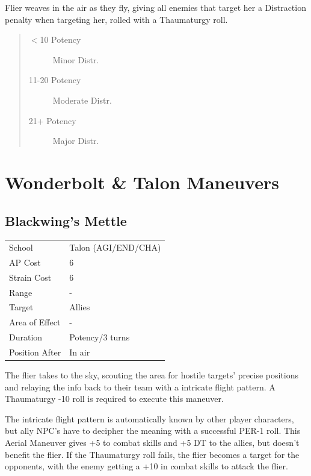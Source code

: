 \documentclass[11pt,a4paper,twocolumn]{book}
\begin{document}
\medskip

Flier weaves in the air as they fly, giving all enemies that target her a Distraction penalty when targeting her, rolled with a Thaumaturgy roll.

\begin{quote}
  \begin{description}
    \item[$<$10 Potency] 	Minor Distr.
    \item[11-20 Potency] 	Moderate Distr.
    \item[21+ Potency] 	Major Distr.
  \end{description}
\end{quote}

\vfill

\section*{Wonderbolt \& Talon Maneuvers}

\subsection*{Blackwing's Mettle}
{
	\begin{tabu} to 75mm{| X[l,4] | X[l,7] |}
		\hline
		School 			& Talon (AGI/END/CHA) 			\\
        AP Cost	      	& 6 				\\
        Strain Cost     & 6 				\\
        Range     		& - 				\\
        Target      	& Allies 			\\
        Area of Effect  & - 	 			\\
        Duration     	& Potency/3 turns 	 \\
		Position After  & In air 			\\ \hline
	\end{tabu}
		
}

\medskip

The flier takes to the sky, scouting the area for hostile targets' precise positions and relaying the info back to their team with a intricate flight pattern. A Thaumaturgy -10 roll is required to execute this maneuver.

The intricate flight pattern is automatically known by other player characters, but ally NPC's have to decipher the meaning with a successful PER-1 roll.
This Aerial Maneuver gives +5 to combat skills and +5 DT to the allies, but doesn't benefit the flier. If the Thaumaturgy roll fails, the flier becomes a target for the opponents, with the enemy getting a +10 in combat skills to attack the flier.
\end{document}
